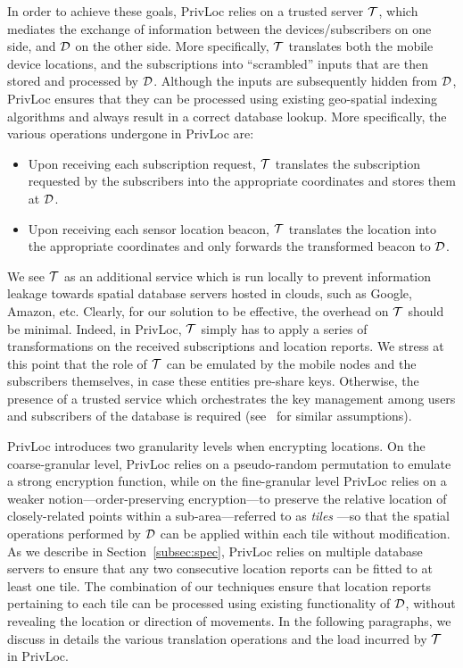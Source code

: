 \documentclass{llncs}
\newcommand\sol{{\sf PrivLoc}}
\begin{document}
In order to achieve these goals, \sol{} relies on a trusted server $\cal T$, which mediates the exchange of information between the devices/subscribers on one side, and $\cal D$ on the other side. More specifically,
$\cal T$ translates both the mobile device locations, and the subscriptions into ``scrambled'' inputs that are then stored and processed by $\cal D$.
Although the inputs are subsequently hidden from $\cal D$, \sol{} ensures that they can be processed using existing geo-spatial indexing algorithms and always result in a correct database lookup. More specifically, the various operations undergone in \sol{} are:
\begin{itemize}
\item Upon receiving each subscription request, $\cal T$ translates the subscription requested by the subscribers into the appropriate coordinates and stores them at ${\cal D}$.
\item Upon receiving each sensor location beacon, $\cal T$ translates the location into the appropriate coordinates and only forwards the transformed beacon to ${\cal D}$.
\end{itemize}

We see $\cal T$ as an additional service which is run locally to prevent information leakage towards spatial database servers hosted in clouds, such as Google, Amazon, etc.
Clearly, for our solution to be effective, the overhead on $\cal T$ should be minimal. Indeed, in \sol, $\cal T$ simply
has to apply a series of transformations on the received subscriptions and location reports. We stress at this point that the role of $\cal T$ can be emulated by the mobile nodes and the subscribers themselves, in case
these entities pre-share keys. Otherwise, the presence of a trusted service which orchestrates the key management among users and subscribers of the database is required (see~\cite{Chow:2007:EPC:1784462.1784477,Bamba:2008:SAL:1367497.1367531,Gruteser:2003:AUL:1066116.1189037,Kalnis:2007:PLI:1313047.1313203,DBLP:conf/infocom/WangXHZLX12} for similar assumptions).


\sol{} introduces
two granularity levels when encrypting locations. On the coarse-granular level, \sol{} relies on a pseudo-random permutation to emulate a strong encryption function, while on the fine-granular level \sol{} relies on
a weaker notion---order-preserving encryption---to preserve the relative location of closely-related points within a sub-area---referred to as \emph{tiles}
---so that the spatial operations performed by $\cal D$ can be applied within each tile
without modification. As we describe in Section~\ref{subsec:spec}, \sol{} relies on multiple database servers to ensure that any two consecutive location reports can be fitted to at least one tile. The combination
of our techniques ensure
that location reports pertaining to each tile can be processed using existing functionality of $\cal D$, without revealing the location or direction of movements. In the following paragraphs, we discuss in details the various translation operations and the load incurred by $\cal T$ in \sol.
\end{document}
